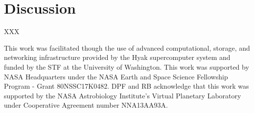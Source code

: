 \documentclass[twocolumn]{aastex61}
\begin{document}
\section{Discussion} \label{sec:discussion}

XXX

\acknowledgments
This work was facilitated though the use of advanced computational, storage, and networking infrastructure provided by the Hyak supercomputer system and funded by the STF at the University of Washington. This work was supported by NASA Headquarters under the NASA Earth and Space Science Fellowship Program - Grant 80NSSC17K0482.  DPF and RB acknowledge that this work was supported by the NASA Astrobiology Institute's Virtual Planetary Laboratory under Cooperative Agreement number NNA13AA93A. 



\end{document}

